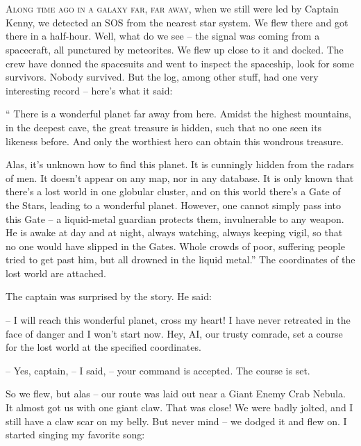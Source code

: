 \documentclass[ebook,oneside,final,openright]{memoir}
\begin{document}
\chapter{}
\par
\lettrine{A}{long time ago in a galaxy far, far away,} when we still were led by Captain Kenny, we detected an SOS from the nearest star system. We flew there and got there in a half-hour. Well, what do we see – the signal was coming from a spacecraft, all punctured by meteorites. We flew up close to it and docked. The crew have donned the spacesuits and went to inspect the spaceship, look for some survivors. Nobody survived. But the log, among other stuff, had one very interesting record – here’s what it said:\par
\par
“ There is a wonderful planet far away from here. Amidst the highest mountains, in the deepest cave, the great treasure is hidden, such that no one seen its likeness before. And only the worthiest hero can obtain this wondrous treasure. \par
Alas, it’s unknown how to find this planet. It is cunningly hidden from the radars of men. It doesn’t appear on any map, nor in any database. It is only known that there’s a lost world in one globular cluster, and on this world there’s a Gate of the Stars, leading to a wonderful planet. However, one cannot simply pass into this Gate – a liquid-metal guardian protects them, invulnerable to any weapon. He is awake at day and at night, always watching, always keeping vigil, so that no one would have slipped in the Gates. Whole crowds of poor, suffering people tried to get past him, but all drowned in the liquid metal.” The coordinates of the lost world are attached.\par
\par
The captain was surprised by the story. He said:\par
– I will reach this wonderful planet, cross my heart! I have never retreated in the face of danger and I won’t start now. Hey, AI, our trusty comrade, set a course for the lost world at the specified coordinates.\par
– Yes, captain, – I said, – your command is accepted. The course is set.\par
So we flew, but alas – our route was laid out near a Giant Enemy Crab Nebula. It almost got us with one giant claw. That was close! We were badly jolted, and I still have a claw scar on my belly. But never mind – we dodged it and flew on. I started singing my favorite song: \par
\end{document}
